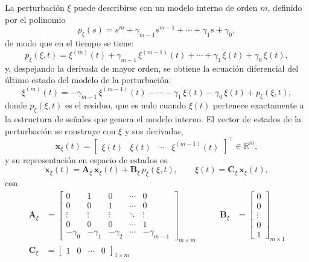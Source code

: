 La perturbación $\xi$ puede describirse con un modelo interno de
orden $m$, definido por el polinomio
\begin{equation}
p_{\xi}(s) = s^{m} + \gamma_{m-1}s^{m-1} + \cdots + \gamma_1 s + \gamma_0 ,
\end{equation}
de modo que en el tiempo se tiene:
\begin{equation}
p_{\xi}(\xi,t) = \xi^{(m)}(t) + \gamma_{m-1}\,\xi^{(m-1)}(t) + \cdots
+ \gamma_1\,\dot{\xi}(t) + \gamma_0\,\xi(t) ,
\label{eq:pMI}
\end{equation}
y, despejando la derivada de mayor orden, se obtiene la ecuación diferencial del
último estado del modelo de la perturbación:
\begin{equation}
\xi^{(m)}(t) = -\gamma_{m-1}\,\xi^{(m-1)}(t) - \cdots
- \gamma_1\,\dot{\xi}(t) - \gamma_0\,\xi(t) + p_{\xi}(\xi,t),
\label{eq:pMI2}
\end{equation}
donde $p_{\xi}(\xi,t)$ es el residuo, que es nulo cuando $\xi(t)$ pertenece
exactamente a la estructura de señales que genera el modelo interno. El vector de
estados de la perturbación se construye con $\xi$ y sus derivadas,
\begin{equation}
\mathbf{x}_{\xi}(t) =
\begin{bmatrix} \xi(t) & \dot{\xi}(t) & \cdots & \xi^{(m-1)}(t) \end{bmatrix}^{\top}
\in \mathbb{R}^{m},
\end{equation}
y su representación en espacio de estados es
\begin{equation}
\dot{\mathbf{x}}_{\xi}(t) = \mathbf{A}_{\xi}\,\mathbf{x}_{\xi}(t) + \mathbf{B}_{\xi}\,p_{\xi}(\xi,t),
\qquad
\xi(t) = \mathbf{C}_{\xi}\,\mathbf{x}_{\xi}(t),
\end{equation}
con
\begin{equation}
  \begin{aligned}
  \mathbf{A}_{\xi} &=
  \begin{bmatrix}
  0 & 1 & 0 & \cdots & 0 \\
  0 & 0 & 1 & \cdots & 0 \\
  \vdots & \vdots & \vdots & \ddots & \vdots \\
  0 & 0 & 0 & \cdots & 1 \\
  -\gamma_0 & -\gamma_1 & -\gamma_2 & \cdots & -\gamma_{m-1}
  \end{bmatrix}_{m \times m}
  & \qquad
  \mathbf{B}_{\xi} &=
  \begin{bmatrix}
  0 \\ 0 \\ \vdots \\ 0 \\ 1
  \end{bmatrix}_{m \times 1} \\[1.5em]
  \mathbf{C}_{\xi} &=
  \begin{bmatrix}
  1 & 0 & \cdots & 0
  \end{bmatrix}_{1 \times m}
  & &
  \end{aligned}
\end{equation}
